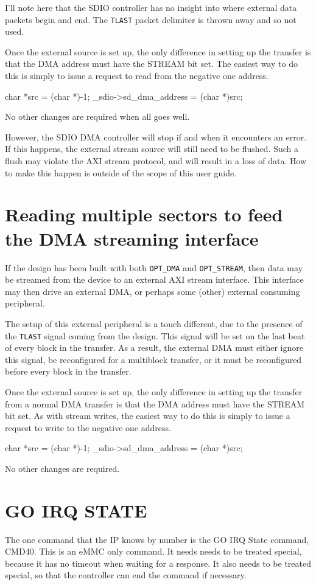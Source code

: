 \documentclass{gqtekspec}
\begin{document}
I'll note here that the SDIO controller has no insight into where
external data packets begin and end.  The {\tt TLAST} packet delimiter
is thrown away and so not used.

Once the external source is set up, the only difference in setting up the
transfer is that the DMA address must have the STREAM bit set.  The easiest
way to do this is simply to issue a request to read from the negative
one address.
\begin{zCpp}
	char	*src = (char *)-1;
	_sdio->sd_dma_address = (char *)src;
\end{zCpp}

No other changes are required when all goes well.

However, the SDIO DMA controller will stop if and when it encounters an error.
If this happens, the external stream source will still need to be flushed.
Such a flush may violate the AXI stream protocol, and will result in a loss
of data.  How to make this happen is outside of the scope of this user guide.
\section{Reading multiple sectors to feed the DMA streaming interface}
If the design has been built with both {\tt OPT\_DMA} and
{\tt OPT\_STREAM}, then data may be streamed from the device to an
external AXI stream interface.  This interface may then drive
an external DMA, or perhaps some (other) external consuming peripheral.

The setup of this external peripheral is a touch different, due to the
presence of the {\tt TLAST} signal coming from the design.  This signal
will be set on the last beat of every block in the transfer.  As a result,
the external DMA must either ignore this signal, be reconfigured for a
multiblock transfer, or it must be reconfigured before every block
in the transfer.

Once the external source is set up, the only difference in setting up the
transfer from a normal DMA transfer is that the DMA address must have the
STREAM bit set.  As with stream writes, the easiest way to do this is simply
to issue a request to write to the negative one address.
\begin{zCpp}
	char	*src = (char *)-1;
	_sdio->sd_dma_address = (char *)src;
\end{zCpp}

No other changes are required.
\section{GO IRQ STATE}
The one command that the IP knows by number is the GO IRQ State command,
CMD40.  This is an eMMC only command.  It needs needs to be treated special,
because it has no timeout when waiting for a response.  It also needs to be
treated special, so that the controller can end the command if necessary.
\end{document}

